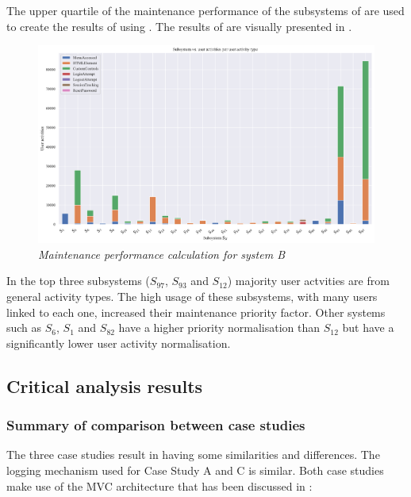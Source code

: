 

The upper quartile of the maintenance performance of the subsystems of  are used to create the results of  using . The results of  are visually presented in .

\clearpage

\begin{figure}[!htb]
	\centering %
	\includegraphics[width=0.95\linewidth]{img/ch3/analysis/case_C_subsystems_1.pdf}
	\caption[Maintenance performance calculation for system B]
	{\textit{Maintenance performance calculation for system B}}\label{fig:ch3_systemCBar}
\end{figure} 

In  the top three subsystems ($S_{97}$, $S_{93}$ and $S_{12}$) majority user actvities are from general activity types. The high usage of these subsystems, with many users linked to each one, increased their maintenance priority factor. Other systems such as $S_{6}$, $S_{1}$ and $S_{82}$ have a higher priority normalisation than $S_{12}$ but have a significantly lower user activity normalisation. 

\subsection{Critical analysis results}\label{sec:ch3_criticalAnalysis}

\subsubsection{Summary of comparison between case studies}
The three case studies result in  having some similarities and differences. The logging mechanism used for Case Study A and C is similar. Both case studies make use of the MVC architecture that has been discussed in :

